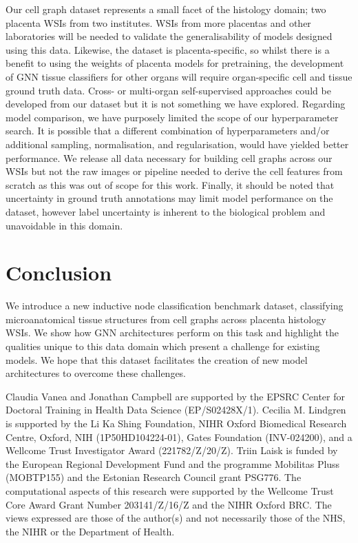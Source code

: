 \documentclass{article}
\begin{document}
Our cell graph dataset represents a small facet of the histology domain; two placenta WSIs from two institutes. WSIs from more placentas and other laboratories will be needed to validate the generalisability of models designed using this data. Likewise, the dataset is placenta-specific, so whilst there is a benefit to using the weights of placenta models for pretraining, the development of GNN tissue classifiers for other organs will require organ-specific cell and tissue ground truth data. Cross- or multi-organ self-supervised approaches could be developed from our dataset but it is not something we have explored. Regarding model comparison, we have purposely limited the scope of our hyperparameter search. It is possible that a different combination of hyperparameters and/or additional sampling, normalisation, and regularisation, would have yielded better performance. We release all data necessary for building cell graphs across our WSIs but not the raw images or pipeline needed to derive the cell features from scratch as this was out of scope for this work. Finally, it should be noted that uncertainty in ground truth annotations may limit model performance on the dataset, however label uncertainty is inherent to the biological problem and unavoidable in this domain.

\section{Conclusion}

We introduce a new inductive node classification benchmark dataset, classifying microanatomical tissue structures from cell graphs across placenta histology WSIs. We show how GNN architectures perform on this task and highlight the qualities unique to this data domain which present a challenge for existing models. We hope that this dataset facilitates the creation of new model architectures to overcome these challenges.

\begin{ack}

Claudia Vanea and Jonathan Campbell are supported by the EPSRC Center for Doctoral Training in Health Data Science (EP/S02428X/1). Cecilia M. Lindgren is supported by the Li Ka Shing Foundation, NIHR Oxford Biomedical Research Centre, Oxford, NIH (1P50HD104224-01), Gates Foundation (INV-024200), and a Wellcome Trust Investigator Award (221782/Z/20/Z). Triin Laisk is funded by the European Regional Development Fund and the programme Mobilitas Pluss (MOBTP155) and the Estonian Research Council grant PSG776. The computational aspects of this research were supported by the Wellcome Trust Core Award Grant Number 203141/Z/16/Z and the NIHR Oxford BRC. The views expressed are those of the author(s) and not necessarily those of the NHS, the NIHR or the Department of Health.

\end{ack}
\end{document}
